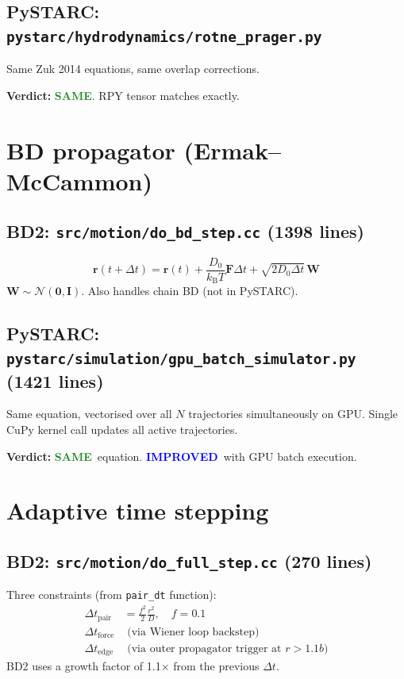 \documentclass[11pt]{article}
\newcommand{\kBT}{k_{\mathrm{B}}T}
\newcommand{\same}{\textcolor{ForestGreen}{\textbf{SAME}}}
\newcommand{\improved}{\textcolor{Blue}{\textbf{IMPROVED}}}
\begin{document}
\subsection{PySTARC: \texttt{pystarc/hydrodynamics/rotne\_prager.py}}
Same Zuk 2014 equations, same overlap corrections.

\textbf{Verdict:} \same. RPY tensor matches exactly.


\section{BD propagator (Ermak--McCammon)}

\subsection{BD2: \texttt{src/motion/do\_bd\_step.cc} (1398 lines)}
\begin{equation}
\mathbf{r}(t+\Delta t) = \mathbf{r}(t) + \frac{D_0}{\kBT}\mathbf{F}\Delta t
+ \sqrt{2D_0\Delta t}\,\mathbf{W}
\end{equation}
$\mathbf{W} \sim \mathcal{N}(\mathbf{0},\mathbf{I})$.
Also handles chain BD (not in PySTARC).

\subsection{PySTARC: \texttt{pystarc/simulation/gpu\_batch\_simulator.py} (1421 lines)}
Same equation, vectorised over all $N$ trajectories simultaneously on GPU.
Single CuPy kernel call updates all active trajectories.

\textbf{Verdict:} \same\ equation. \improved\ with GPU batch execution.


\section{Adaptive time stepping}

\subsection{BD2: \texttt{src/motion/do\_full\_step.cc} (270 lines)}
Three constraints (from \texttt{pair\_dt} function):
\begin{align}
\Delta t_\mathrm{pair} &= \frac{f^2}{2}\frac{r^2}{D}, \quad f = 0.1 \\
\Delta t_\mathrm{force} &\text{ (via Wiener loop backstep)} \\
\Delta t_\mathrm{edge} &\text{ (via outer propagator trigger at } r > 1.1b\text{)}
\end{align}
BD2 uses a growth factor of 1.1$\times$ from the previous $\Delta t$.
\end{document}
